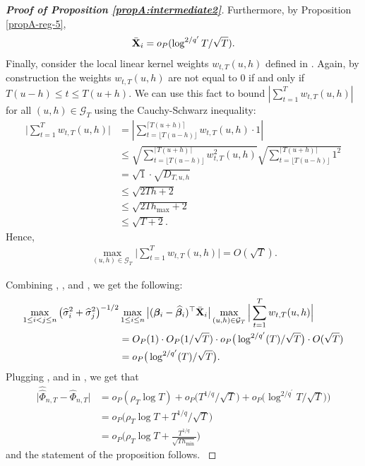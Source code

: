 \documentclass[a4paper,12pt]{article}
\makeatletter
\renewcommand{\eqref}[1]{\tagform@{\ref{#1}}}
\newcommand{\doublehattwo}[1]{\widehat{\widehat{#1}}}
\makeatother
\begin{document}
\begin{proof}[\textnormal{\textbf{Proof of Proposition \ref{propA:intermediate2}}}]
Furthermore, by Proposition \ref{propA-reg-5}, 
{\color{black}\begin{align}\label{eq:proof12}
\bar{\mathbf{X}}_i = o_P(\log^{2/{q^\prime}}{T}/\sqrt{T}).
\end{align}}
Finally, consider the local linear kernel weights $w_{t,T}(u,h)$ defined in \eqref{eq:weights}. Again, by construction the weights $w_{t, T}(u, h)$ are not equal to $0$ if and only if \linebreak $T(u-h) \le t \le T(u+h)$. We can use this fact to bound  $\left| \sum_{t=1}^T w_{t,T}(u,h)  \right|$ for all $(u, h) \in \mathcal{G}_T$ using the Cauchy-Schwarz inequality:
\begin{align*}
\Big| \sum_{t=1}^T w_{t,T}(u,h)   \Big| & = \left| \sum_{t=\lfloor T(u-h) \rfloor}^{\lceil T(u+h) \rceil} w_{t,T}(u,h) \cdot 1  \right|  \\
&\leq \sqrt{\sum_{t=\lfloor T(u-h) \rfloor}^{\lceil T(u+h) \rceil} w^2_{t,T}(u,h)}\sqrt{\sum_{t=\lfloor T(u-h) \rfloor}^{\lceil T(u+h) \rceil} 1^2}\\
&=\sqrt{1}\cdot\sqrt{D_{T, u, h}} \\
&  \leq \sqrt{2Th + 2} \\
&\leq \sqrt{2Th_{\max} +2} \\
&\leq\sqrt{T+2}.
\end{align*}
Hence, 
\begin{align}\label{ineq-diff-13}
\max_{(u,h) \in \mathcal{G}_T}  \Big| \sum_{t=1}^T w_{t,T}(u,h)  \Big| = O(\sqrt{T}).
\end{align}

Combining \eqref{ineq-diff-11}, \eqref{ineq-diff-12}, \eqref{eq:proof12} and \eqref{ineq-diff-13}, we get the following:
{\color{black}\begin{align}\label{ineq-diff-14}
\begin{split}
\max_{1\le i < j \le n} \big(\widehat{\sigma}_i^2+ \widehat{\sigma}_j^2 \big)^{-1/2}&\max_{1\le i  \le n}\big|(\bm{\beta}_i - \widehat{\bm{\beta}}_i)^\top\bar{\mathbf{X}}_{i}\big| \max_{(u,h) \in \mathcal{G}_T}  \Big| \sum_{t=1}^T w_{t,T}(u,h)  \Big|   \\
&=O_P(1) \cdot O_P(1/\sqrt{T}) \cdot o_P\big(\log^{2/{q^\prime}}(T)/\sqrt{T}\big) \cdot O(\sqrt{T})\\
& = o_P\big(\log^{2/{q^\prime}}(T)/\sqrt{T}\big).
\end{split}
\end{align}}
Plugging \eqref{ineq-diff-5}, \eqref{ineq-diff-10} and \eqref{ineq-diff-14} in \eqref{ineq-diff-1}, we get that 
{\color{black}\begin{align*}
\big|\doublehattwo{\Phi}_{n,T} - \widehat{\Phi}_{n,T}\big| &= o_P(\rho_T\log{T}) + o_P\big(T^{1/q}/\sqrt{T}) + o_P\big(\log^{2/{q^\prime}}{T}/\sqrt{T}\big)) \\
& = o_P\Big(\rho_T\log{T} + T^{1/q}/\sqrt{T}\Big)\\
& = o_P\bigg(\rho_T\log{T} + \frac{T^{1/q}}{\sqrt{T h_{\min}}}\bigg)
\end{align*}
and the statement of the proposition follows.
}
\end{proof}
\end{document}

